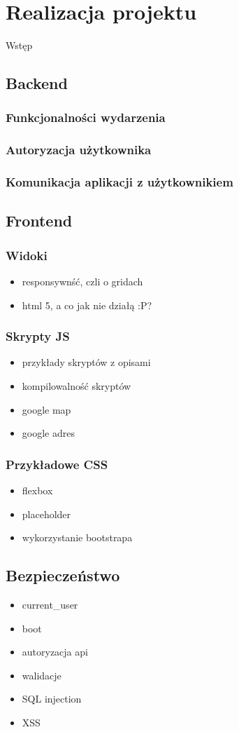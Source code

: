 \section{Realizacja projektu}
Wstęp
  \subsection{Backend}
    \subsubsection{Funkcjonalności wydarzenia}
    \subsubsection{Autoryzacja użytkownika}
    \subsubsection{Komunikacja aplikacji z użytkownikiem}
  \subsection{Frontend}
    \subsubsection{Widoki}
      \begin{itemize}
        \item responsywnść, czli o gridach
        \item html 5, a co jak nie działą :P?
      \end{itemize}
    \subsubsection{Skrypty JS}
      \begin{itemize}
        \item przykłady skryptów z opisami
        \item kompilowalność skryptów
        \item google map
        \item google adres
      \end{itemize}
    \subsubsection{Przykładowe CSS}
      \begin{itemize}
        \item flexbox
        \item placeholder
        \item wykorzystanie bootstrapa
      \end{itemize}
  \subsection{Bezpieczeństwo}
    \begin{itemize}
      \item current\_user
      \item boot
      \item autoryzacja api
      \item walidacje
      \item SQL injection
      \item XSS
    \end{itemize}

